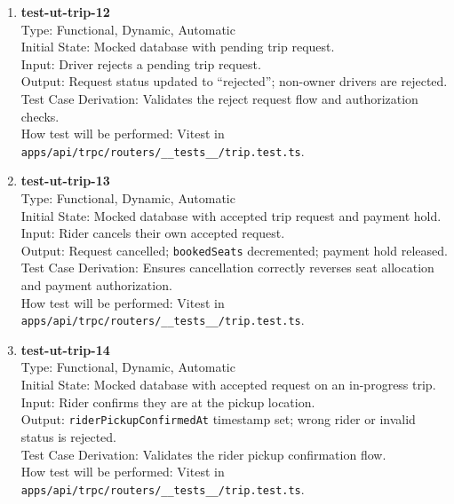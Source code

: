 \documentclass[12pt, titlepage]{article}
\begin{document}
\begin{enumerate}
\item \textbf{test-ut-trip-12}\\
Type: Functional, Dynamic, Automatic\\
Initial State: Mocked database with pending trip request.\\
Input: Driver rejects a pending trip request.\\
Output: Request status updated to ``rejected''; non-owner drivers are rejected.\\
Test Case Derivation: Validates the reject request flow and authorization checks.\\
How test will be performed: Vitest in \texttt{apps/api/trpc/routers/\_\_tests\_\_/trip.test.ts}.\\

\item \textbf{test-ut-trip-13}\\
Type: Functional, Dynamic, Automatic\\
Initial State: Mocked database with accepted trip request and payment hold.\\
Input: Rider cancels their own accepted request.\\
Output: Request cancelled; \texttt{bookedSeats} decremented; payment hold released.\\
Test Case Derivation: Ensures cancellation correctly reverses seat allocation and payment authorization.\\
How test will be performed: Vitest in \texttt{apps/api/trpc/routers/\_\_tests\_\_/trip.test.ts}.\\

\item \textbf{test-ut-trip-14}\\
Type: Functional, Dynamic, Automatic\\
Initial State: Mocked database with accepted request on an in-progress trip.\\
Input: Rider confirms they are at the pickup location.\\
Output: \texttt{riderPickupConfirmedAt} timestamp set; wrong rider or invalid status is rejected.\\
Test Case Derivation: Validates the rider pickup confirmation flow.\\
How test will be performed: Vitest in \texttt{apps/api/trpc/routers/\_\_tests\_\_/trip.test.ts}.\\


\end{enumerate}
\end{document}
